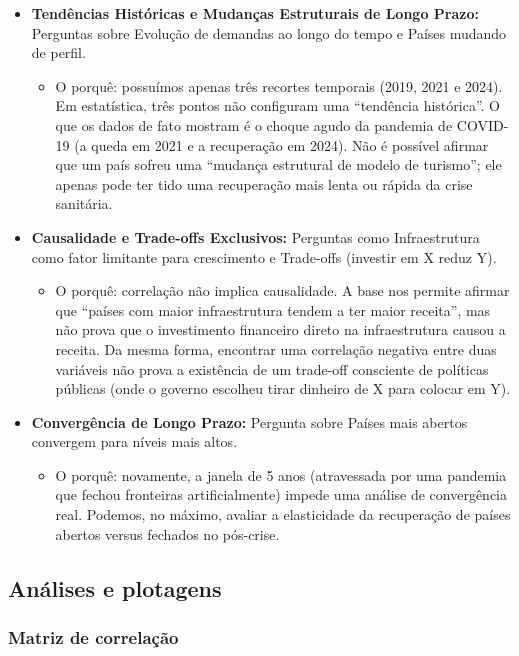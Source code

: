 \documentclass[
]{article}
\providecommand{\tightlist}{%
  \setlength{\itemsep}{0pt}\setlength{\parskip}{0pt}}
\begin{document}
\begin{itemize}
\item
  \textbf{Tendências Históricas e Mudanças Estruturais de Longo Prazo:}
  Perguntas sobre Evolução de demandas ao longo do tempo e Países
  mudando de perfil.

  \begin{itemize}
  \tightlist
  \item
    O porquê: possuímos apenas três recortes temporais (2019, 2021 e
    2024). Em estatística, três pontos não configuram uma ``tendência
    histórica''. O que os dados de fato mostram é o choque agudo da
    pandemia de COVID-19 (a queda em 2021 e a recuperação em 2024). Não
    é possível afirmar que um país sofreu uma ``mudança estrutural de
    modelo de turismo''; ele apenas pode ter tido uma recuperação mais
    lenta ou rápida da crise sanitária.
  \end{itemize}
\item
  \textbf{Causalidade e Trade-offs Exclusivos:} Perguntas como
  Infraestrutura como fator limitante para crescimento e Trade-offs
  (investir em X reduz Y).

  \begin{itemize}
  \tightlist
  \item
    O porquê: correlação não implica causalidade. A base nos permite
    afirmar que ``países com maior infraestrutura tendem a ter maior
    receita'', mas não prova que o investimento financeiro direto na
    infraestrutura causou a receita. Da mesma forma, encontrar uma
    correlação negativa entre duas variáveis não prova a existência de
    um trade-off consciente de políticas públicas (onde o governo
    escolheu tirar dinheiro de X para colocar em Y).
  \end{itemize}
\item
  \textbf{Convergência de Longo Prazo:} Pergunta sobre Países mais
  abertos convergem para níveis mais altos.

  \begin{itemize}
  \tightlist
  \item
    O porquê: novamente, a janela de 5 anos (atravessada por uma
    pandemia que fechou fronteiras artificialmente) impede uma análise
    de convergência real. Podemos, no máximo, avaliar a elasticidade da
    recuperação de países abertos versus fechados no pós-crise.
  \end{itemize}
\end{itemize}

\subsection{Análises e plotagens}\label{anuxe1lises-e-plotagens}

\subsubsection{Matriz de correlação}\label{matriz-de-correlauxe7uxe3o}
\end{document}
